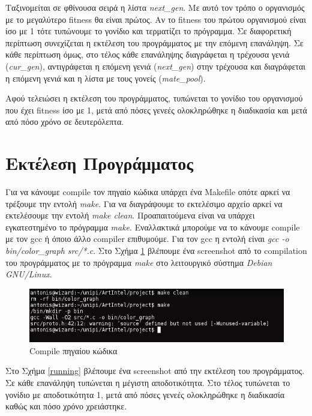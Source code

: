 \documentclass{article}
\begin{document}
Ταξινομείται σε φθίνουσα σειρά η λίστα \emph{next\_gen}. Με αυτό τον τρόπο ο
οργανισμός με το μεγαλύτερο fitness θα είναι πρώτος. Αν το fitness του πρώτου
οργανισμού είναι ίσο με 1 τότε τυπώνουμε το γονίδιο και τερματίζει το πρόγραμμα.
Σε διαφορετική περίπτωση συνεχίζεται η εκτέλεση του προγράμματος με την επόμενη
επανάληψη. Σε κάθε περίπτωση όμως, στο τέλος κάθε επανάληψης διαγράφεται η
τρέχουσα γενιά (\emph{cur\_gen}), αντιγράφεται η επόμενη γενιά
(\emph{next\_gen}) στην τρέχουσα και διαγράφεται η επόμενη γενιά και η λίστα με
τους γονείς (\emph{mate\_pool}).

Αφού τελειώσει η εκτέλεση του προγράμματος, τυπώνεται το γονίδιο του οργανισμού
που έχει fitness ίσο με 1, μετά από πόσες γενεές ολοκληρώθηκε η διαδικασία και
μετά από πόσο χρόνο σε δευτερόλεπτα.

\section{Εκτέλεση Προγράμματος}
Για να κάνουμε compile τον πηγαίο κώδικα υπάρχει ένα Makefile οπότε αρκεί να
τρέξουμε την εντολή \emph{make}. Για να διαγράψουμε το εκτελέσιμο αρχείο αρκεί
να εκτελέσουμε την εντολή \emph{make clean}. Προαπαιτούμενα είναι να υπάρχει
εγκατεστημένο το
πρόγραμμα \emph{make}. Εναλλακτικά μπορούμε να το κάνουμε compile με τον gcc ή
όποιο άλλο compiler επιθυμούμε. Για τον gcc η εντολή είναι \emph{gcc -o
bin/color\_graph src/*.c}.
Στο Σχήμα \ref{compile} βλέπουμε ένα screenshot από το compilation του προγράμματος
με το πρόγραμμα \emph{make} στο λειτουργικό σύστημα \emph{Debian GNU/Linux}.
\begin{figure}[tbh]
\centering
\includegraphics[scale=0.7]{make.png}
\caption{Compile πηγαίου κώδικα}
\label{compile}
\end{figure}

Στο Σχήμα \ref{running} βλέπουμε ένα screenshot από την εκτέλεση του
προγράμματος. Σε κάθε επανάληψη τυπώνεται η μέγιστη αποδοτικότητα. Στο
τέλος τυπώνεται το γονίδιο με αποδοτικότητα 1, μετά από πόσες γενεές
ολοκληρώθηκε η διαδικασία καθώς και πόσο χρόνο χρειάστηκε.
\end{document}
